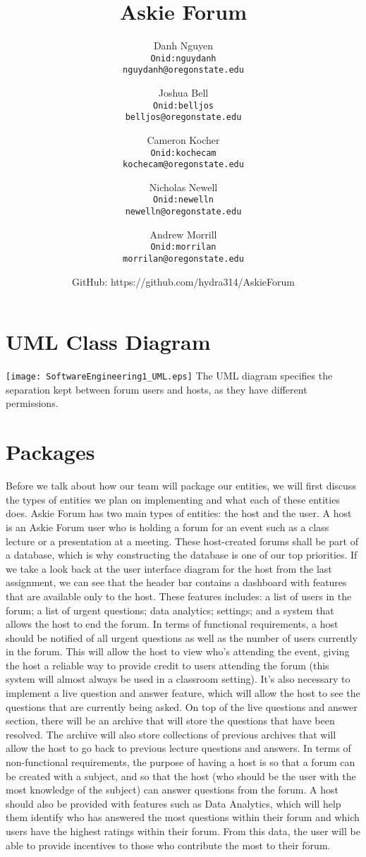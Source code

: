 \documentclass[12pt]{article}
\title{Askie Forum}
\author{
         Danh Nguyen\\
         \texttt{Onid:nguydanh}\\
         \texttt{nguydanh@oregonstate.edu}
         \and
         Joshua Bell\\
         \texttt{Onid:belljos}\\
         \texttt{belljos@oregonstate.edu}
         \and
         Cameron Kocher\\
         \texttt{Onid:kochecam}\\
         \texttt{kochecam@oregonstate.edu}
         \and
         Nicholas Newell\\
         \texttt{Onid:newelln}\\
         \texttt{newelln@oregonstate.edu}
         \and
         Andrew Morrill\\
         \texttt{Onid:morrilan}\\
         \texttt{morrilan@oregonstate.edu}
         \and
         GitHub: https://github.com/hydra314/AskieForum
    }
\begin{document}
\maketitle

\tableofcontents
\section{UML Class Diagram}
   \texttt{[image: SoftwareEngineering1\_UML.eps]}
    The UML diagram specifies the separation kept between forum users and hosts, as they have different permissions.
\section{Packages}
Before we talk about how our team will package our entities, we will first discuss the types of entities we plan on implementing and what each of these entities does. Askie Forum has two main types of entities: the host and the user. A host is an Askie Forum user who is holding a forum for an event such as a class lecture or a presentation at a meeting. These host-created forums shall be part of a database, which is why constructing the database is one of our top priorities. If we take a look back at the user interface diagram for the host from the last assignment, we can see that the header bar contains a dashboard with features that are available only to the host. These features includes: a list of users in the forum; a list of urgent questions; data analytics; settings; and a system that allows the host to end the forum. In terms of functional requirements, a host should be notified of all urgent questions as well as the number of users currently in the forum. This will allow the host to view who's attending the event, giving the host a reliable way to provide credit to users attending the forum (this system will almost always be used in a classroom setting). It's also necessary to implement a live question and answer feature, which will allow the host to see the questions that are currently being asked. On top of the live questions and answer section, there will be an archive that will store the questions that have been resolved. The archive will also store collections of previous archives that will allow the host to go back to previous lecture questions and answers. In terms of non-functional requirements, the purpose of having a host is so that a forum can be created with a subject, and so that the host (who should be the user with the most knowledge of the subject) can answer questions from the forum. A host should also be provided with features such as Data Analytics, which will help them identify who has answered the most questions within their forum and which users have the highest ratings within their forum. From this data, the user will be able to provide incentives to those who contribute the most to their forum. 
\end{document}
